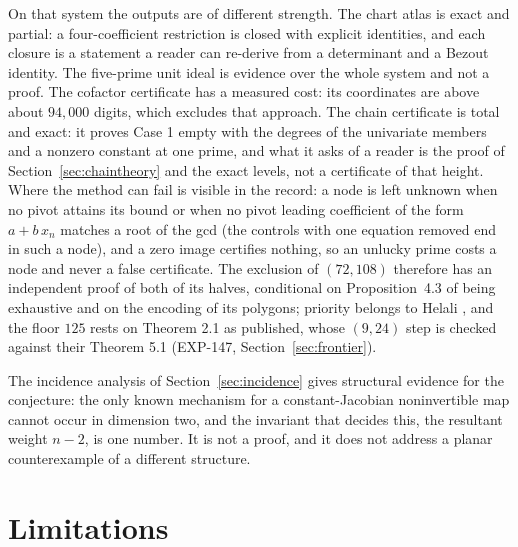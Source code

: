 \documentclass[11pt]{article}
\theoremstyle{remark}
\begin{document}
On that system the outputs are of different strength. The chart atlas is exact and partial: a four-coefficient restriction is closed with explicit identities, and each
closure is a statement a reader can re-derive from a determinant and a Bezout identity. The five-prime unit ideal is evidence over the whole system and not a proof. The cofactor certificate has a measured cost: its coordinates are above about $94{,}000$ digits,
which excludes that approach. The chain certificate is total and exact: it proves Case 1 empty with the degrees of the univariate members and a nonzero constant at one prime, and what it asks of a reader is the proof of Section~\ref{sec:chaintheory} and the exact levels, not a certificate of that height.
Where the method can fail is visible in the record: a node is left unknown when no pivot attains its bound or when no pivot leading coefficient of the form $a+b\,x_n$ matches a root of the gcd (the controls with one equation removed end in such a node), and a zero image certifies nothing, so an unlucky prime costs a node and never a false certificate.
The exclusion of $(72,108)$ therefore has an independent proof of both of its halves, conditional on Proposition~4.3 of \cite{GGHV2022} being exhaustive and on the encoding of its polygons; priority belongs to Helali \cite{Helali2026}, and the floor $125$ rests on Theorem 2.1 as published, whose $(9,24)$ step is checked against their Theorem 5.1 (EXP-147, Section~\ref{sec:frontier}).

The incidence analysis of Section~\ref{sec:incidence} gives structural evidence for the conjecture: the only known mechanism for a constant-Jacobian noninvertible map cannot occur in dimension two, and
the invariant that decides this, the resultant weight $n-2$, is one number. It is not a proof, and it does not address a planar counterexample of a different structure.

\section{Limitations}\label{sec:limits}
\end{document}
